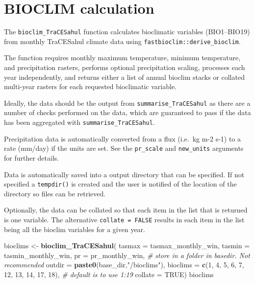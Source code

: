 \documentclass[
]{article}
\newenvironment{Shaded}{\begin{snugshade}}{\end{snugshade}}
\newcommand{\AttributeTok}[1]{\textcolor[rgb]{0.13,0.29,0.53}{#1}}
\newcommand{\CommentTok}[1]{\textcolor[rgb]{0.56,0.35,0.01}{\textit{#1}}}
\newcommand{\ConstantTok}[1]{\textcolor[rgb]{0.56,0.35,0.01}{#1}}
\newcommand{\DecValTok}[1]{\textcolor[rgb]{0.00,0.00,0.81}{#1}}
\newcommand{\FunctionTok}[1]{\textcolor[rgb]{0.13,0.29,0.53}{\textbf{#1}}}
\newcommand{\NormalTok}[1]{#1}
\newcommand{\OtherTok}[1]{\textcolor[rgb]{0.56,0.35,0.01}{#1}}
\newcommand{\StringTok}[1]{\textcolor[rgb]{0.31,0.60,0.02}{#1}}
\begin{document}
\section{BIOCLIM calculation}\label{bioclim-calculation}

The \texttt{bioclim\_TraCESahul} function calculates bioclimatic
variables (BIO1--BIO19) from monthly TraCESahul climate data using
\texttt{fastbioclim::derive\_bioclim}.

The function requires monthly maximum temperature, minimum temperature,
and precipitation rasters, performs optional precipitation scaling,
processes each year independently, and returns either a list of annual
bioclim stacks or collated multi-year rasters for each requested
bioclimatic variable.

Ideally, the data should be the output from
\texttt{summarise\_TraCESahul} as there are a number of checks performed
on the data, which are guaranteed to pass if the data has been
aggregated with \texttt{summarise\_TraCESahul}.

Precipitation data is automatically converted from a flux (i.e.~kg m-2
s-1) to a rate (mm/day) if the units are set. See the \texttt{pr\_scale}
and \texttt{new\_units} arguments for further details.

Data is automatically saved into a output directory that can be
specified. If not specified a \texttt{tempdir()} is created and the user
is notified of the location of the directory so files can be retrieved.

Optionally, the data can be collated so that each item in the list that
is returned is one variable. The alternative \texttt{collate\ =\ FALSE}
results in each item in the list being all the bioclim variables for a
given year.

\begin{Shaded}
\begin{Highlighting}[]
\NormalTok{bioclims }\OtherTok{\textless{}{-}} \FunctionTok{bioclim\_TraCESahul}\NormalTok{(}
  \AttributeTok{tasmax =}\NormalTok{ tasmax\_monthly\_win,}
  \AttributeTok{tasmin =}\NormalTok{ tasmin\_monthly\_win,}
  \AttributeTok{pr =}\NormalTok{ pr\_monthly\_win,}
  \CommentTok{\# store in a folder in basedir. Not recommended}
  \AttributeTok{outdir =} \FunctionTok{paste0}\NormalTok{(base\_dir,}\StringTok{"/bioclims"}\NormalTok{),}
  \AttributeTok{bioclims =} \FunctionTok{c}\NormalTok{(}\DecValTok{1}\NormalTok{, }\DecValTok{4}\NormalTok{, }\DecValTok{5}\NormalTok{, }\DecValTok{6}\NormalTok{, }\DecValTok{7}\NormalTok{, }\DecValTok{12}\NormalTok{, }\DecValTok{13}\NormalTok{, }\DecValTok{14}\NormalTok{, }\DecValTok{17}\NormalTok{, }\DecValTok{18}\NormalTok{), }\CommentTok{\# default is to use 1:19}
  \AttributeTok{collate =} \ConstantTok{TRUE}\NormalTok{)}
\NormalTok{bioclims}
\end{Highlighting}
\end{Shaded}
\end{document}
